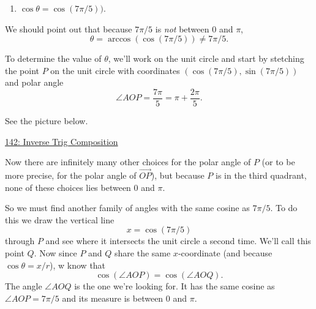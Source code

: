 \documentclass{ximera}
\begin{document}
\begin{question}
\begin{explanation}
\begin{enumerate}
\item $\cos \theta =  \cos(7\pi/5))$.
\end{enumerate}

We should point out that because $7\pi/5$ is \emph{not} between $0$ and $\pi$,
\[
   \theta =   \arccos (\cos (7\pi/5)) \neq 7\pi/5 .
\]

To determine the value of $\theta$, we'll work on the unit circle and start by stetching the point $P$ on the unit circle with coordinates $(\cos (7\pi/5), \sin(7\pi/5))$ and polar angle 
\[
     \angle AOP =  \frac{7\pi}{5} = \pi + \frac{2\pi}{5} .
\]

See the picture below.

\href{https://www.desmos.com/calculator/wzxssez3fu}{142: Inverse Trig Composition}

 
\begin{onlineOnly}
    \begin{center}
\end{center}
\end{onlineOnly}

Now there are infinitely many other choices for the polar angle of $P$ (or to be more precise, for the polar angle of $\overrightarrow{OP}$), but because $P$ is in the third quadrant, none of these choices lies between $0$ and $\pi$. 

So we must find another family of angles with the same cosine as $7\pi/5$. To do this we draw the vertical line
\[
   x = \cos(7\pi/5)
\]
through $P$ and see where it intersects the unit circle a second time. We'll call this point $Q$. Now since $P$ and $Q$ share the same $x$-coordinate (and because $\cos\theta = x/r$), w know that
\[
 \cos (\angle AOP) = \cos (\angle AOQ).
\]
The angle $\angle AOQ$ is the one we're looking for. It has the same cosine as $\angle AOP = 7\pi/5$ and its measure is between $0$ and $\pi$. 





\end{explanation}
\end{question}
\end{document}

